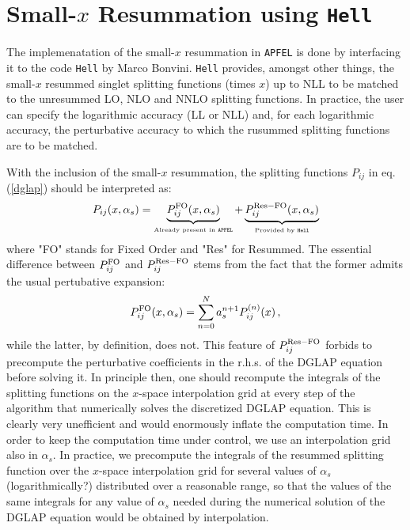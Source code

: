 \documentclass[10pt,a4paper]{article}
\begin{document}
\section{Small-$x$ Resummation using {\tt Hell}}

The implemenatation of the small-$x$ resummation in {\tt APFEL} is
done by interfacing it to the code {\tt Hell} by Marco Bonvini. {\tt Hell}
provides, amongst other things, the small-$x$ resummed singlet splitting
functions (times $x$) up to NLL to be matched to the unresummed LO, NLO and NNLO
splitting functions. In practice, the user can specify the logarithmic
accuracy (LL or NLL) and, for each logarithmic accuracy, the
perturbative accuracy to which the rusummed splitting functions are to
be matched.

With the inclusion of the small-$x$ resummation, the splitting
functions ${P}_{ij}$ in eq. (\ref{dglap}) should be interpreted
as:
\begin{equation}\label{ResummedSplittings}
{P}_{ij}(x,\alpha_s) = \underbrace{{P}_{ij}^{\rm
    FO}(x,\alpha_s)}_{\mbox{\tiny Already present in {\tt APFEL}}} +
\underbrace{{P}_{ij}^{\rm Res-FO}(x,\alpha_s)}_{\mbox{\tiny Provided
    by {\tt Hell}}}
\end{equation}
where "FO" stands for Fixed Order and "Res" for Resummed.
The essential difference between ${P}_{ij}^{\rm FO}$ and
${P}_{ij}^{\rm Res-FO}$ stems from the fact that the former admits the
usual pertubative expansion:
\begin{equation}
{P}_{ij}^{\rm FO}(x,\alpha_s) = \sum_{n=0}^N a_s^{n+1} P_{ij}^{(n)}(x)\,,
\end{equation}
while the latter, by definition, does not. This feature of
${P}_{ij}^{\rm Res-FO}$ forbids to precompute the perturbative
coefficients in the r.h.s. of the DGLAP equation before solving it. In principle then,
one should recompute the integrals of the splitting functions on the $x$-space
interpolation grid at every step of the algorithm that numerically
solves the discretized DGLAP equation. This is clearly very
unefficient and would enormously inflate the computation time. In
order to keep the computation time under control, we use
an interpolation grid also in $\alpha_s$. In practice, we precompute
the integrals of the resummed splitting function over the $x$-space
interpolation grid for several values of $\alpha_s$ (logarithmically?)
distributed over a reasonable range, so that the values of the same
integrals for any value of $\alpha_s$ needed during the numerical
solution of the DGLAP equation  would be obtained by interpolation.
\end{document}
